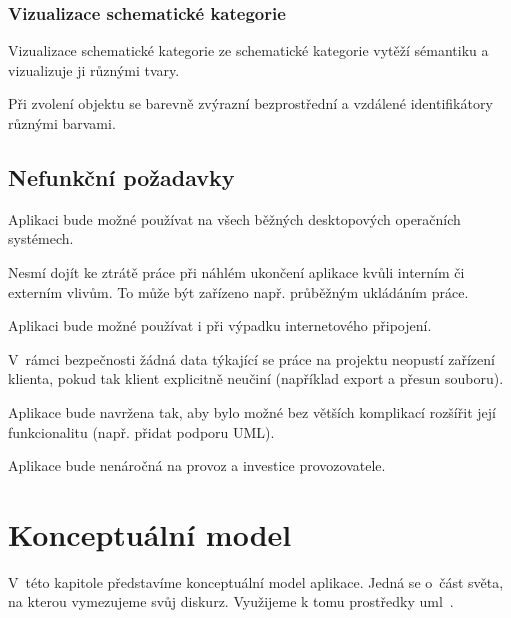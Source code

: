 \subsubsection*{Vizualizace schematické kategorie}
\begin{enumfp}[resume]
  \item Vizualizace schematické kategorie ze schematické kategorie vytěží sémantiku a vizualizuje ji různými tvary.
  \item Při zvolení objektu se barevně zvýrazní bezprostřední a vzdálené identifikátory různými barvami.
\end{enumfp}

\subsection{Nefunkční požadavky}

\begin{enumnfp}
\item Aplikaci bude možné používat na všech běžných desktopových operačních systémech.\label{nfp:can-use-everywhere}
  \item Nesmí dojít ke ztrátě práce při náhlém ukončení aplikace kvůli interním či externím vlivům.
  To může být zařízeno např. průběžným ukládáním práce.
  \item Aplikaci bude možné používat i při výpadku internetového připojení.
  \item V~rámci bezpečnosti žádná data týkající se práce na projektu neopustí zařízení klienta, pokud tak klient explicitně neučiní (například export a přesun souboru).\label{nfp:safety}
  \item Aplikace bude navržena tak, aby bylo možné bez větších komplikací rozšířit její funkcionalitu (např. přidat podporu UML).
  \item Aplikace bude nenáročná na provoz a investice provozovatele.\label{nfp:nenarocnost}
\end{enumnfp}

\section{Konceptuální model}

V~této kapitole představíme konceptuální model aplikace.
Jedná se o~část světa, na kterou vymezujeme svůj diskurz.
Využijeme k tomu prostředky \acrfull{uml}~\cite{omg_uml_2017}.

